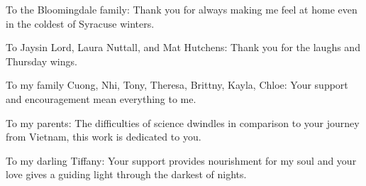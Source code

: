 \documentclass[oneside,12pt]{book}
\begin{document}
To the Bloomingdale family: Thank you for always making me feel at home even in the coldest of Syracuse winters.

To Jaysin Lord, Laura Nuttall, and Mat Hutchens: Thank you for the laughs and Thursday wings.

To my family Cuong, Nhi, Tony, Theresa, Brittny, Kayla, Chloe: Your support and encouragement mean everything to me.

To my parents: The difficulties of science dwindles in comparison to your journey from Vietnam, this work is dedicated to you.

To my darling Tiffany: Your support provides nourishment for my soul and your love gives a guiding light through the darkest of nights.


\tableofcontents


%	
%
%
%
%
%

%
%

\listoffigures
\listoftables

\medskip





	
\end{document}
